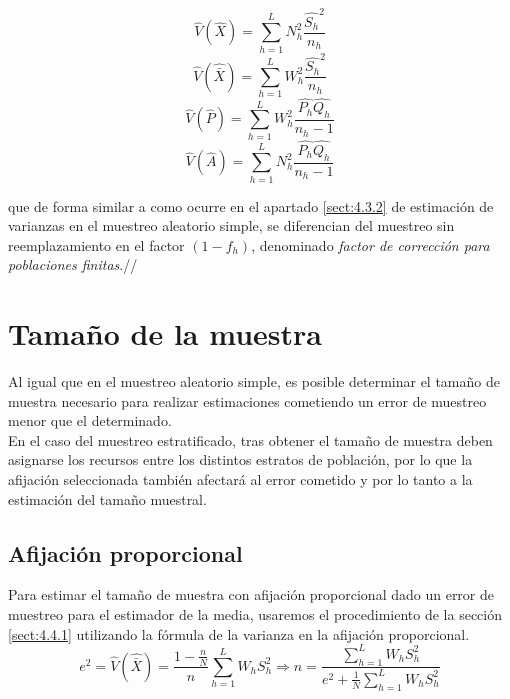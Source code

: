 \begin{equation}
    \hat{V}(\hat{X}) = \sum_{h=1}^{L}N_h^2\frac{\hat{S_h}^2}{n_h}
\end{equation}
\begin{equation}
    \hat{V}(\hat{\bar{X}}) = \sum_{h=1}^{L}W_h^2\frac{\hat{S_h}^2}{n_h}
\end{equation}    
\begin{equation}
    \hat{V}(\hat{P}) = \sum_{h=1}^{L}W_h^2\frac{\hat{P_h}\hat{Q_h}}{n_h-1}
\end{equation}
\begin{equation}
    \hat{V}(\hat{A}) = \sum_{h=1}^{L}N_h^2\frac{\hat{P_h}\hat{Q_h}}{n_h-1}
\end{equation}

que de forma similar a como ocurre en el apartado \ref{sect:4.3.2} de estimación de varianzas en el muestreo aleatorio simple, se diferencian del muestreo sin reemplazamiento en el factor $(1-f_h)$, denominado \textit{factor de corrección para poblaciones finitas}.//




\section{Tamaño de la muestra} \label{sect:4.4}
Al igual que en el muestreo aleatorio simple, es posible determinar el tamaño de muestra necesario para realizar estimaciones cometiendo un error de muestreo menor que el determinado. \\

En el caso del muestreo estratificado, tras obtener el tamaño de muestra deben asignarse los recursos entre los distintos estratos de población, por lo que la afijación seleccionada también afectará al error cometido y por lo tanto a la estimación del tamaño muestral.

\subsection{Afijación proporcional}
Para estimar el tamaño de muestra con afijación proporcional dado un error de muestreo para el estimador de la media, usaremos el procedimiento de la sección \ref{sect:4.4.1} utilizando la fórmula de la varianza en la afijación proporcional.\\

\begin{equation}
    e^2 = \hat{V}(\hat{\bar{X}}) = \frac{1-\frac{n}{N}}{n}\sum\limits_{h=1}^LW_hS_h^2 \Rightarrow n = \frac{\sum\limits_{h=1}^LW_hS_h^2}{e^2+\frac{1}{N}\sum\limits_{h=1}^LW_hS_h^2}
\end{equation}

